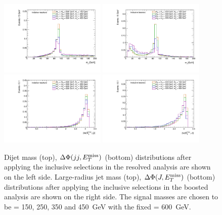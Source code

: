 \begin{figure}
\centering
\includegraphics[width=0.45\textwidth]{texinputs/04_grid/figures/monoz/hadronic/mA600_incl_resl_MJJ_linear.pdf}
\includegraphics[width=0.45\textwidth]{texinputs/04_grid/figures/monoz/hadronic/mA600_incl_merged_MFatJ1_linear.pdf}
\includegraphics[width=0.45\textwidth]{texinputs/04_grid/figures/monoz/hadronic/mA600_incl_resl_dPhiMETJJ_linear.pdf}
\includegraphics[width=0.45\textwidth]{texinputs/04_grid/figures/monoz/hadronic/mA600_incl_merged_dPhiMETJ_linear.pdf}
\caption{Dijet mass (top), $\Delta\Phi(jj, E_T^\mathrm{miss})$ (bottom) distributions 
after applying the inclusive selections in the resolved analysis are shown on the left side. Large-radius 
jet mass (top), $\Delta\Phi(J, E_T^\mathrm{miss})$ (bottom) distributions 
after applying the inclusive selections in the boosted analysis are shown on the right side. 
The signal masses are chosen to be \ma = 150, 250, 350 and 450~GeV with the fixed \mA = 600~GeV.}
\label{fig:monozhad_kin_inc_fixed_mA}
\end{figure}



